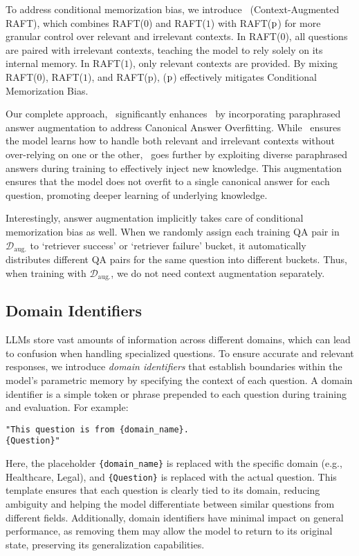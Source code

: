 To address conditional memorization bias, we introduce \raftmix\ (Context-Augmented RAFT), which combines RAFT($\mathrm{0}$) and RAFT($\mathrm{1}$) with RAFT($\mathrm{p}$) for more granular control over relevant and irrelevant contexts. In RAFT($\mathrm{0}$), all questions are paired with irrelevant contexts, teaching the model to rely solely on its internal memory. In RAFT($\mathrm{1}$), only relevant contexts are provided. By mixing RAFT($\mathrm{0}$), RAFT($\mathrm{1}$), and RAFT($\mathrm{p}$), \raftmix($\mathrm{p}$) effectively mitigates Conditional Memorization Bias.

Our complete approach, \ourmethodshort\, significantly enhances \raftmix\ by incorporating paraphrased answer augmentation to address Canonical Answer Overfitting. 
While \raftmix\ ensures the model learns how to handle both relevant and irrelevant contexts without over-relying on one or the other, \ourmethodshort\ goes further by exploiting diverse paraphrased answers during training to effectively inject new knowledge. This augmentation ensures that the model does not overfit to a single canonical answer for each question, promoting deeper learning of underlying knowledge. 

Interestingly, answer augmentation implicitly takes care of conditional memorization bias as well.
When we randomly assign each training QA pair in $\mathcal{D}_{\text{aug.}}$ to `retriever success' or `retriever failure' bucket, it automatically distributes different QA pairs for the same question into different buckets.
Thus, when training with $\mathcal{D}_{\text{aug.}}$, we do not need context augmentation separately.

\subsection{Domain Identifiers}
\label{subsec:domain_indentifiers}
LLMs store vast amounts of information across different domains, which can lead to confusion when handling specialized questions. To ensure accurate and relevant responses, we introduce \emph{domain identifiers} that establish boundaries within the model’s parametric memory by specifying the context of each question. A domain identifier is a simple token or phrase prepended to each question during training and evaluation. For example:

\vspace{5pt}
\noindent\begin{minipage}{\textwidth}
	\noindent\texttt{"This question is from \{domain\_name\}.\\\{Question\}"\\}
\end{minipage} 
Here, the placeholder \texttt{\{domain\_name\}} is replaced with the specific domain (e.g., Healthcare, Legal), and \texttt{\{Question\}} is replaced with the actual question. This template ensures that each question is clearly tied to its domain, reducing ambiguity and helping the model differentiate between similar questions from different fields. Additionally, domain identifiers have minimal impact on general performance, as removing them may allow the model to return to its original state, preserving its generalization capabilities.


